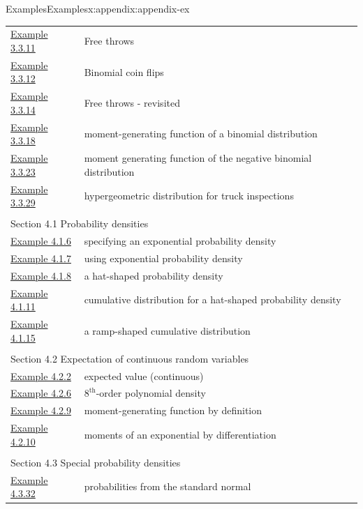 \documentclass[oneside,10pt,]{book}
\numberwithin{equation}{section}
\begin{document}
\begin{appendixptx}{Examples}{}{Examples}{}{}{x:appendix:appendix-ex}
\begin{longtable}[l]{ll}
\hyperref[x:example:ex-bin-bball]{Example 3.3.11}& Free throws\\
\hyperref[x:example:ex-bin-coins]{Example 3.3.12}& Binomial coin flips\\
\hyperref[x:example:ex-bin-bball2]{Example 3.3.14}& Free throws - revisited\\
\hyperref[x:example:ex-bin-mgf]{Example 3.3.18}& moment-generating function of a binomial distribution\\
\hyperref[x:example:ex-negbin-mgf]{Example 3.3.23}& moment generating function of the negative binomial distribution\\
\hyperref[x:example:ex-hyper]{Example 3.3.29}& hypergeometric distribution for truck inspections\\
\multicolumn{2}{l}{\null}\\[1.5ex] \multicolumn{2}{l}{\large Section 4.1 Probability densities}\\[0.5ex]
\hyperref[x:example:ex-exponential]{Example 4.1.6}& specifying an exponential probability density\\
\hyperref[x:example:ex-exponential2]{Example 4.1.7}& using exponential probability density\\
\hyperref[x:example:ex-hat]{Example 4.1.8}& a hat-shaped probability density\\
\hyperref[x:example:ex-hat-cdf]{Example 4.1.11}& cumulative distribution for a hat-shaped probability density\\
\hyperref[x:example:ex-F-to-f]{Example 4.1.15}& a ramp-shaped cumulative distribution\\
\multicolumn{2}{l}{\null}\\[1.5ex] \multicolumn{2}{l}{\large Section 4.2 Expectation of continuous random variables}\\[0.5ex]
\hyperref[x:example:ex-cont-exp]{Example 4.2.2}& expected value (continuous)\\
\hyperref[x:example:ex-poly]{Example 4.2.6}& \(8^{\text{th}}\)-order polynomial density\\
\hyperref[x:example:ex-exp-MGF]{Example 4.2.9}& moment-generating function by definition\\
\hyperref[x:example:ex-exp-mgf-by-diff]{Example 4.2.10}& moments of an exponential by differentiation\\
\multicolumn{2}{l}{\null}\\[1.5ex] \multicolumn{2}{l}{\large Section 4.3 Special probability densities}\\[0.5ex]
\hyperref[x:example:ex-std-norm-probs]{Example 4.3.32}& probabilities from the standard normal\\

\end{longtable}
\end{appendixptx}
\end{document}
